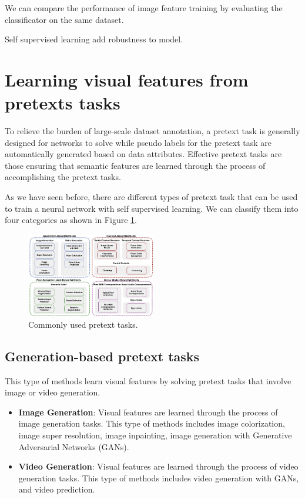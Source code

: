 We can compare the performance of image feature training by evaluating the
classificator on the same dataset.
\begin{note}
      Self supervised learning add robustness to model.
\end{note}
\section{Learning visual features from pretexts tasks}
To relieve the burden of large-scale dataset annotation, a pretext task is generally
designed for networks to solve while pseudo labels for the pretext task are
automatically generated based on data attributes. Effective pretext tasks are
those ensuring that semantic features are learned through the process of accomplishing
the pretext tasks.

As we have seen before, there are different types of pretext task that can be used
to train a neural network with self supervised learning. We can classify them
into four categories as shown in Figure \ref{fig:SSL}.

\begin{figure}[!ht]
      \centering
      \includegraphics[width=0.5\textwidth]{img/SSL/commonlyPreText.png}
      \caption{Commonly used pretext tasks.}
      \label{fig:SSL}
\end{figure}

\subsection{Generation-based pretext tasks}
This type of methods learn visual features by solving pretext tasks that involve
image or video generation.
\begin{itemize}
      \item \textbf{Image Generation}: Visual features are learned through the
            process of image generation tasks. This type of methods includes image
            colorization, image super resolution, image inpainting, image generation
            with Generative Adversarial Networks (GANs).
      \item \textbf{Video Generation}: Visual features are learned through the
            process of video generation tasks. This type of methods includes video
            generation with GANs, and video prediction.
\end{itemize}

